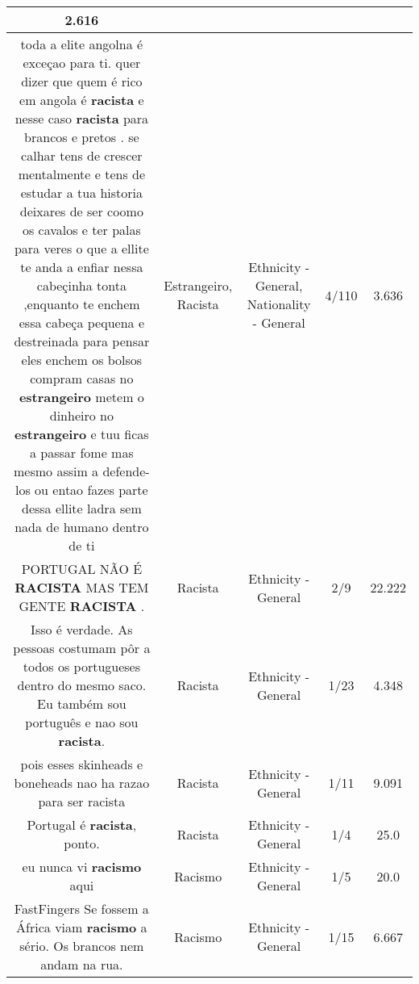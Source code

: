 \documentclass[11pt]{article}
\newlength\mylength
\begin{document}
\begin{center}
\begin{longtable}{|C{.65\mylength}|C{.30\mylength}|C{.12\mylength}|C{.12\mylength}|C{.12\mylength}|}
2.616 \\  \hline
  \small toda a elite angolna é exceçao para ti. quer dizer que quem é rico em angola é \textbf{racista} e nesse caso \textbf{racista} para brancos e pretos . se calhar tens de crescer mentalmente e tens de estudar a tua historia deixares de ser coomo os cavalos e ter palas para veres o que a ellite te anda a enfiar nessa cabeçinha tonta ,enquanto te enchem essa cabeça pequena e destreinada para pensar eles enchem os bolsos compram casas no \textbf{estrangeiro} metem o dinheiro no \textbf{estrangeiro} e tuu ficas a passar fome mas mesmo assim a defende-los ou entao fazes parte dessa ellite ladra sem nada de humano dentro de ti\normalsize   & Estrangeiro, Racista & Ethnicity - General, Nationality - General & 4/110 & 3.636 \\  \hline
  \small PORTUGAL NÃO É \textbf{RACISTA} MAS TEM GENTE \textbf{RACISTA} .\normalsize   & Racista & Ethnicity - General & 2/9 & 22.222 \\  \hline
  \small Isso é verdade. As pessoas costumam pôr a todos os portugueses dentro do mesmo saco. Eu também sou português e nao sou \textbf{racista}.\normalsize   & Racista & Ethnicity - General & 1/23 & 4.348 \\  \hline
  \small pois esses skinheads e boneheads nao ha razao para ser racista\normalsize   & Racista & Ethnicity - General & 1/11 & 9.091 \\  \hline
  \small Portugal é \textbf{racista}, ponto.\normalsize   & Racista & Ethnicity - General & 1/4 & 25.0 \\  \hline
  \small eu nunca vi \textbf{racismo} aqui\normalsize   & Racismo & Ethnicity - General & 1/5 & 20.0 \\  \hline
  \small FastFingers Se fossem a África viam \textbf{racismo} a sério. Os brancos nem andam na rua.\normalsize   & Racismo & Ethnicity - General & 1/15 & 6.667 \\  \hline

\end{longtable}
\end{center}
\end{document}
